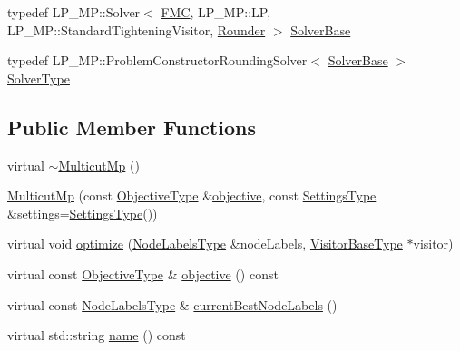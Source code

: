 \begin{DoxyCompactItemize}
\item 
typedef L\+P\+\_\+\+M\+P\+::\+Solver$<$ \hyperlink{classnifty_1_1graph_1_1opt_1_1multicut_1_1MulticutMp_a3612b09afe1b53b4a070428a6d565ae4}{F\+MC}, L\+P\+\_\+\+M\+P\+::\+LP, L\+P\+\_\+\+M\+P\+::\+Standard\+Tightening\+Visitor, \hyperlink{classnifty_1_1graph_1_1opt_1_1multicut_1_1MulticutMp_a797fe1696d6c09f66835e7899cf3c9fb}{Rounder} $>$ \hyperlink{classnifty_1_1graph_1_1opt_1_1multicut_1_1MulticutMp_a083d15e66e37aad75b545f674cef535d}{Solver\+Base}
\item 
typedef L\+P\+\_\+\+M\+P\+::\+Problem\+Constructor\+Rounding\+Solver$<$ \hyperlink{classnifty_1_1graph_1_1opt_1_1multicut_1_1MulticutMp_a083d15e66e37aad75b545f674cef535d}{Solver\+Base} $>$ \hyperlink{classnifty_1_1graph_1_1opt_1_1multicut_1_1MulticutMp_a483417844d807ee94101839b5db8a98b}{Solver\+Type}
\end{DoxyCompactItemize}
\subsection*{Public Member Functions}
\begin{DoxyCompactItemize}
\item 
virtual \hyperlink{classnifty_1_1graph_1_1opt_1_1multicut_1_1MulticutMp_abe966edae703fac2d047ab4eefe146db}{$\sim$\+Multicut\+Mp} ()
\item 
\hyperlink{classnifty_1_1graph_1_1opt_1_1multicut_1_1MulticutMp_a90465e1daa1cabe6cf0cb5fe97872d87}{Multicut\+Mp} (const \hyperlink{classnifty_1_1graph_1_1opt_1_1multicut_1_1MulticutMp_a9fefe9d9756a1eef71329656d2fdf9f4}{Objective\+Type} \&\hyperlink{classnifty_1_1graph_1_1opt_1_1multicut_1_1MulticutMp_a78aabd921e89cc3b4f4a5287a97b27ac}{objective}, const \hyperlink{structnifty_1_1graph_1_1opt_1_1multicut_1_1MulticutMp_1_1SettingsType}{Settings\+Type} \&settings=\hyperlink{structnifty_1_1graph_1_1opt_1_1multicut_1_1MulticutMp_1_1SettingsType}{Settings\+Type}())
\item 
virtual void \hyperlink{classnifty_1_1graph_1_1opt_1_1multicut_1_1MulticutMp_a7f9c04be26314b677b58570dd5f9fbfa}{optimize} (\hyperlink{classnifty_1_1graph_1_1opt_1_1multicut_1_1MulticutMp_a7afb88ab31185de5cef8a3d98022c0a2}{Node\+Labels\+Type} \&node\+Labels, \hyperlink{classnifty_1_1graph_1_1opt_1_1multicut_1_1MulticutMp_af8d6587bb26bf816e5900ec4831f32b9}{Visitor\+Base\+Type} $\ast$visitor)
\item 
virtual const \hyperlink{classnifty_1_1graph_1_1opt_1_1multicut_1_1MulticutMp_a9fefe9d9756a1eef71329656d2fdf9f4}{Objective\+Type} \& \hyperlink{classnifty_1_1graph_1_1opt_1_1multicut_1_1MulticutMp_a78aabd921e89cc3b4f4a5287a97b27ac}{objective} () const
\item 
virtual const \hyperlink{classnifty_1_1graph_1_1opt_1_1multicut_1_1MulticutMp_a7afb88ab31185de5cef8a3d98022c0a2}{Node\+Labels\+Type} \& \hyperlink{classnifty_1_1graph_1_1opt_1_1multicut_1_1MulticutMp_a9b359aa0b88830fa4d44a4d115a06042}{current\+Best\+Node\+Labels} ()
\item 
virtual std\+::string \hyperlink{classnifty_1_1graph_1_1opt_1_1multicut_1_1MulticutMp_ad70677c1535224e3ebd403d30faccbd9}{name} () const
\end{DoxyCompactItemize}


